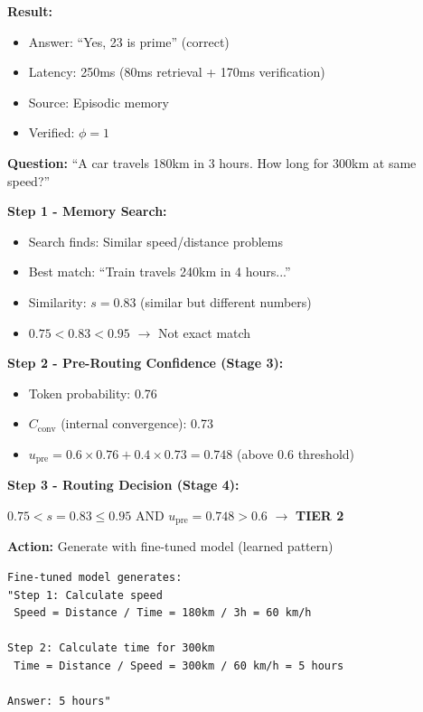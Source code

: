 \documentclass[12pt,a4paper]{article}
\theoremstyle{definition}
\newcommand{\upre}{u_{\text{pre}}}
\newcommand{\Cconv}{C_{\text{conv}}}
\begin{document}
\begin{examplebox}[title=Tier 1: Exact Match Retrieval]
\textbf{Result:}
\begin{itemize}
    \item Answer: ``Yes, 23 is prime'' (correct)
    \item Latency: 250ms (80ms retrieval + 170ms verification)
    \item Source: Episodic memory
    \item Verified: $\phi = 1$
\end{itemize}
\end{examplebox}

\begin{examplebox}[title=Tier 2: Fine-Tuned Model Generation]

\textbf{Question:} ``A car travels 180km in 3 hours. How long for 300km at same speed?''

\textbf{Step 1 - Memory Search:}
\begin{itemize}
    \item Search finds: Similar speed/distance problems
    \item Best match: ``Train travels 240km in 4 hours...''
    \item Similarity: $s = 0.83$ (similar but different numbers)
    \item $0.75 < 0.83 < 0.95$ $\rightarrow$ Not exact match
\end{itemize}

\textbf{Step 2 - Pre-Routing Confidence (Stage 3):}
\begin{itemize}
    \item Token probability: 0.76
    \item $\Cconv$ (internal convergence): 0.73
    \item $\upre = 0.6 \times 0.76 + 0.4 \times 0.73 = 0.748$ (above 0.6 threshold)
\end{itemize}

\textbf{Step 3 - Routing Decision (Stage 4):}

$0.75 < s = 0.83 \leq 0.95$ AND $\upre = 0.748 > 0.6$ $\rightarrow$ \textbf{TIER 2}

\textbf{Action:} Generate with fine-tuned model (learned pattern)

\begin{verbatim}
Fine-tuned model generates:
"Step 1: Calculate speed
 Speed = Distance / Time = 180km / 3h = 60 km/h

Step 2: Calculate time for 300km
 Time = Distance / Speed = 300km / 60 km/h = 5 hours

Answer: 5 hours"
\end{verbatim}


\end{examplebox}
\end{document}
